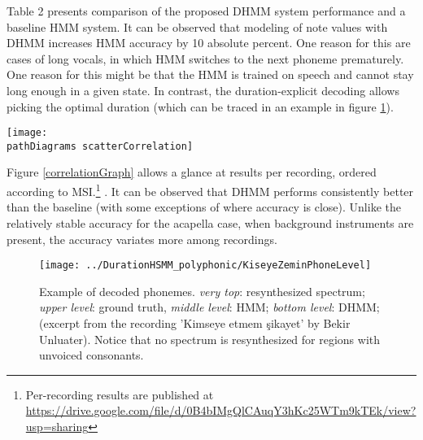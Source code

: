 \documentclass{article}
\def\pathDiagrams{/Users/joro/Documents/Phd/UPF/papers/DurationHSMM_polyphonic_EUSIPCO/}
\begin{document}
Table 2 presents comparison of the proposed DHMM system performance
and a baseline HMM system. It can be observed that modeling of note
values with DHMM increases HMM accuracy by 10 absolute percent. One
reason for this are cases of long vocals, in which HMM switches to the next phoneme prematurely. One reason for this might be that the HMM is trained on speech and cannot stay long enough in
a given state. In contrast, the duration-explicit decoding allows
picking the optimal duration (which can be traced in an example in
figure \ref{example-of-decoded-Praat}). 
\begin{figure*}
\begin{minipage}[t]{1\columnwidth}%
\centering\texttt{[image: \\pathDiagrams scatterCorrelation]}%
\end{minipage}

\protect\caption{Comparison between results from DHMM (for both polyphonic and acapella)
and baseline HMM. The metric used is alignment accuracy. A connected triple
of shapes represents results for one recording. Results are ordered
according to\emph{ musical score in-sync }(on horizontal axis)}


\label{correlationGraph}
\end{figure*}


\textcolor{red}{\emph{}}%


Figure \ref{correlationGraph} allows a glance at results per recording,
ordered according to MSI.\footnote{Per-recording results are published at \url{https://drive.google.com/file/d/0B4bIMgQlCAuqY3hKc25WTm9kTEk/view?usp=sharing}} . It can be observed that DHMM performs
consistently better than the baseline (with some exceptions of where
accuracy is close). Unlike the relatively stable accuracy for the
acapella case, when background instruments are present, the accuracy
variates more among recordings. 
\begin{figure}
\centering\texttt{[image: ../DurationHSMM\_polyphonic/KiseyeZeminPhoneLevel]}

\protect\caption{Example of decoded phonemes. \emph{very top}: resynthesized spectrum;\emph{
upper level}: ground truth, \emph{middle level}: HMM; \emph{bottom
level}: DHMM;\emph{ }(excerpt from the recording 'Kimseye etmem \c{s}ikayet'
by Bekir Unluater). Notice that no spectrum is resynthesized for regions with unvoiced consonants.}
\textcolor{blue}{\label{example-of-decoded-Praat}}
\end{figure}
\end{document}
